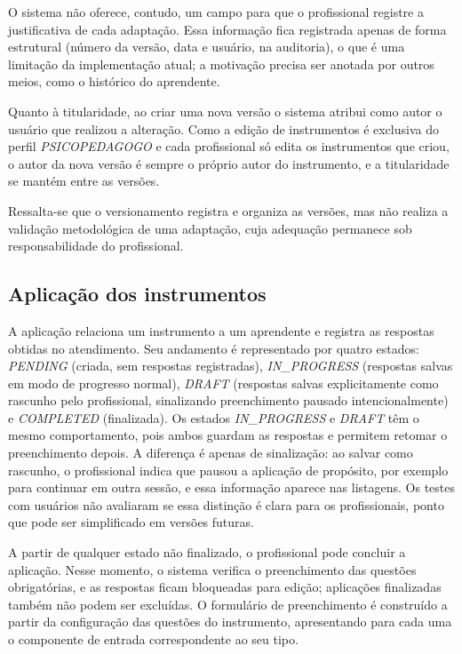 O sistema não oferece, contudo, um campo para que o profissional registre a justificativa de cada adaptação. Essa informação fica registrada apenas de forma estrutural (número da versão, data e usuário, na auditoria), o que é uma limitação da implementação atual; a motivação precisa ser anotada por outros meios, como o histórico do aprendente.

Quanto à titularidade, ao criar uma nova versão o sistema atribui como autor o usuário que realizou a alteração. Como a edição de instrumentos é exclusiva do perfil \textit{PSICOPEDAGOGO} e cada profissional só edita os instrumentos que criou, o autor da nova versão é sempre o próprio autor do instrumento, e a titularidade se mantém entre as versões.

Ressalta-se que o versionamento registra e organiza as versões, mas não realiza a validação metodológica de uma adaptação, cuja adequação permanece sob responsabilidade do profissional.

\subsection{Aplicação dos instrumentos}\label{sec:aplicacoes}

A aplicação relaciona um instrumento a um aprendente e registra as respostas obtidas no atendimento. Seu andamento é representado por quatro estados: \textit{PENDING} (criada, sem respostas registradas), \textit{IN\_PROGRESS} (respostas salvas em modo de progresso normal), \textit{DRAFT} (respostas salvas explicitamente como rascunho pelo profissional, sinalizando preenchimento pausado intencionalmente) e \textit{COMPLETED} (finalizada). Os estados \textit{IN\_PROGRESS} e \textit{DRAFT} têm o mesmo comportamento, pois ambos guardam as respostas e permitem retomar o preenchimento depois. A diferença é apenas de sinalização: ao salvar como rascunho, o profissional indica que pausou a aplicação de propósito, por exemplo para continuar em outra sessão, e essa informação aparece nas listagens. Os testes com usuários não avaliaram se essa distinção é clara para os profissionais, ponto que pode ser simplificado em versões futuras.

A partir de qualquer estado não finalizado, o profissional pode concluir a aplicação. Nesse momento, o sistema verifica o preenchimento das questões obrigatórias, e as respostas ficam bloqueadas para edição; aplicações finalizadas também não podem ser excluídas. O formulário de preenchimento é construído a partir da configuração das questões do instrumento, apresentando para cada uma o componente de entrada correspondente ao seu tipo.

